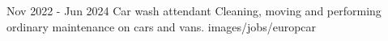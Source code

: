 {Nov 2022 - Jun 2024}
{Car wash attendant}
{Cleaning, moving and performing ordinary maintenance on cars and vans.}
{images/jobs/europcar}
